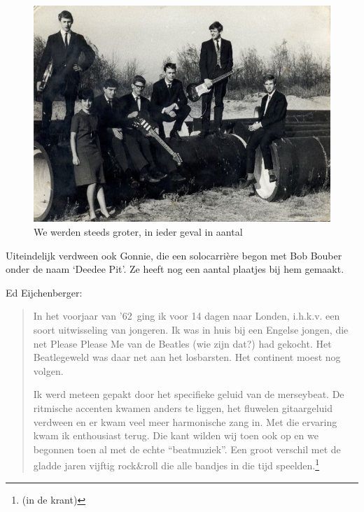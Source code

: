 \documentclass[10pt,twoside, openright]{memoir}
\begin{document}
\begin{figure}
\includegraphics[width=\textwidth]{img/ch26/1965}
\caption*{\footnotesize We werden steeds groter, in ieder geval in aantal}
\end{figure}

Uiteindelijk verdween ook Gonnie, die een solocarrière begon met Bob Bouber onder de naam `Deedee Pit'. Ze heeft nog een aantal plaatjes bij hem gemaakt.

Ed Eijchenberger: 

\begin{quote}
In het voorjaar van '62 ging ik voor 14 dagen naar Londen, i.h.k.v. een soort uitwisseling van jongeren. Ik was in huis bij een Engelse jongen, die net Please Please Me van de Beatles (wie zijn dat?) had gekocht. Het Beatlegeweld was daar net aan het losbarsten. Het continent moest nog volgen. 

Ik werd meteen gepakt door het specifieke geluid van de merseybeat. De ritmische accenten kwamen anders te liggen, het fluwelen gitaargeluid verdween en er kwam veel meer harmonische zang in. Met die ervaring kwam ik enthousiast terug. Die kant wilden wij toen ook op en we begonnen toen al met de echte “beatmuziek”. Een groot verschil met de gladde jaren vijftig rock&roll die alle bandjes in die tijd speelden.\footnote{(in de krant)}
\end{quote}
\end{document}
